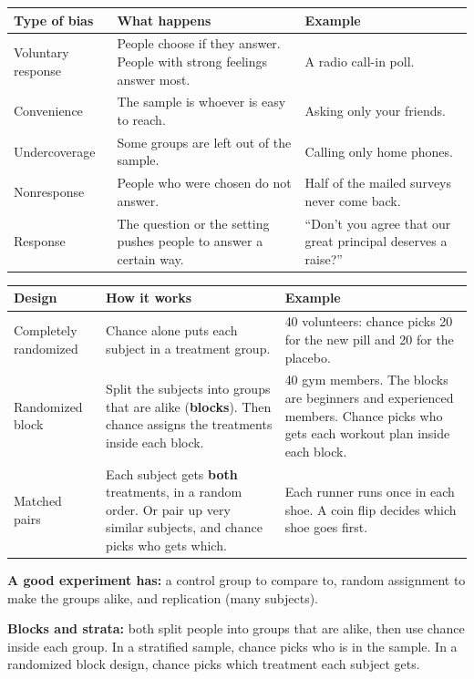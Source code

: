 \documentclass[11pt]{article}
\newcommand{\sumhead}[1]{\par\vspace{0.7em}{\large\bfseries #1}\par\vspace{0.3em}}
\begin{document}
\sumhead{Bias}
\begin{tabular}{|L{1.4in}|L{2.5in}|L{2.55in}|}\hline
\textbf{Type of bias} & \textbf{What happens} & \textbf{Example}\\ \hline
Voluntary response & People choose if they answer. People with strong feelings answer most. & A radio call-in poll.\\ \hline
Convenience & The sample is whoever is easy to reach. & Asking only your friends.\\ \hline
Undercoverage & Some groups are left out of the sample. & Calling only home phones.\\ \hline
Nonresponse & People who were chosen do not answer. & Half of the mailed surveys never come back.\\ \hline
Response & The question or the setting pushes people to answer a certain way. & ``Don't you agree that our great principal deserves a raise?''\\ \hline
\end{tabular}

\newpage
\sumhead{Experiment Designs}
\begin{tabular}{|L{1.4in}|L{2.5in}|L{2.55in}|}\hline
\textbf{Design} & \textbf{How it works} & \textbf{Example}\\ \hline
Completely randomized & Chance alone puts each subject in a treatment group. & 40 volunteers: chance picks 20 for the new pill and 20 for the placebo.\\ \hline
Randomized block & Split the subjects into groups that are alike (\textbf{blocks}). Then chance assigns the treatments inside each block. & 40 gym members. The blocks are beginners and experienced members. Chance picks who gets each workout plan inside each block.\\ \hline
Matched pairs & Each subject gets \textbf{both} treatments, in a random order. Or pair up very similar subjects, and chance picks who gets which. & Each runner runs once in each shoe. A coin flip decides which shoe goes first.\\ \hline
\end{tabular}

\vspace{0.5em}
\textbf{A good experiment has:} a control group to compare to, random assignment to make the groups alike, and replication (many subjects).

\vspace{0.4em}
\textbf{Blocks and strata:} both split people into groups that are alike, then use chance inside each group. In a stratified sample, chance picks who is in the sample. In a randomized block design, chance picks which treatment each subject gets.
\end{document}
